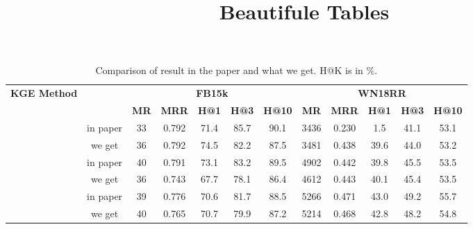 \documentclass{article}
\title{Beautifule Tables}
\begin{document}
	
	\maketitle
	
	\begin{table}[bht]
		\caption{Comparison of result in the paper and what we get. H@K is in \%.}
		\label{tab::results-kge}
		\begin{center}
			\scalebox{0.75}
			{
				\begin{tabular}{c c |c c c c c | c c c c c}\hline
					\multirow{2}{*}{\textbf{KGE Method}}	& \multirow{2}{*}{\textbf{}} & \multicolumn{5}{c|}{\textbf{FB15k}} & \multicolumn{5}{c}{\textbf{WN18RR}}	\\
					& & \textbf{MR} & \textbf{MRR} & \textbf{H@1} & \textbf{H@3} & \textbf{H@10} & \textbf{MR} & \textbf{MRR} & \textbf{H@1} & \textbf{H@3} & \textbf{H@10} \\ 
					\hline
					& in paper & 33 & 0.792 & 71.4 & 85.7 & 90.1 & 3436 & 0.230 & 1.5 & 41.1 & 53.1 \\
					\rowcolor{green!60}  %
					\multirow{-2}{*}{\textbf{TransE}}  %
					& we get & 36 & 0.792 & 74.5 & 82.2 & 87.5 & 3481 & 0.438 & 39.6 & 44.0 & 53.2 \\
					\hline
					& in paper & 40 & 0.791 & 73.1 & 83.2 & 89.5 & 4902 & 0.442 & 39.8 & 45.5 & 53.5 \\
					\rowcolor{green!20}
					\multirow{-2}{*}{\textbf{DistMult}} 
					& we get & 36 & 0.743 & 67.7 & 78.1 & 86.4 & 4612 & 0.443 & 40.1 & 45.4 & 53.5 \\
					\hline
					& in paper & 39 & 0.776 & 70.6 & 81.7 & 88.5 & 5266 & 0.471 & 43.0 & 49.2 & 55.7 \\
					\rowcolor{green}
					\multirow{-2}{*}{\textbf{ComplEx}} 
					& we get & 40 & 0.765 & 70.7 & 79.9 & 87.2 & 5214 & 0.468 & 42.8 & 48.2 & 54.8 \\
					\hline
				\end{tabular}
			}
		\end{center}
		\vspace{-0.15cm}
	\end{table}
\end{document}
